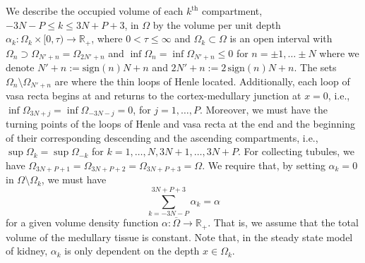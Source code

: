 \documentclass{article}
\begin{document}
We describe the occupied volume of each $k^{\mathrm{th}}$ compartment, $-3N-P\leq k\leq 3N+P+3$, in $\Omega$ by the volume per unit depth $\alpha_k:\Omega_k\times [0,\tau)\to \mathbb{R}_+$, where $0<\tau\leq \infty$ and $\Omega_k\subset\Omega$ is an open interval with $\Omega_{n} \supset \Omega_{N'+n} = \Omega_{2N'+n}$ and $\inf\Omega_n = \inf\Omega_{N'+n}\leq 0$ for $n=\pm 1,\dots\pm N$ where we denote $N'+n := \mathrm{sign}(n)N+n$ and $2N'+n := 2\, \mathrm{sign}(n)N+n$.
The sets $\Omega_n\setminus \Omega_{N'+n}$ are where the thin loops of Henle located.
Additionally, each loop of vasa recta begins at and returns to the cortex-medullary junction at $x=0$, i.e., $\inf \Omega_{3N+j} = \inf \Omega_{-3N-j}=0$, for $j=1,\dots,P$.
Moreover, we must have the turning points of the loops of Henle and vasa recta at the end and the beginning of their corresponding descending and the ascending compartments, i.e., $\sup\Omega_k = \sup\Omega_{-k}$ for $k=1,\dots,N,3N+1,\dots,3N+P$.
For collecting tubules, we have $\Omega_{3N+P+1}=\Omega_{3N+P+2}=\Omega_{3N+P+3}=\Omega$.
We require that, by setting $\alpha_k=0$ in $\Omega\setminus\Omega_k$, we must have
\begin{equation}\label{eq:const_vol}
    \sum_{k=-3N-P}^{3N+P+3} \alpha_k = \alpha
\end{equation}
    for a given volume density function $\alpha:\overline{\Omega}\to\mathbb{R}_+$.
That is, we assume that the total volume of the medullary tissue is constant.
Note that, in the steady state model of kidney, $\alpha_k$ is only dependent on the depth $x\in \Omega_k$.
\end{document}
